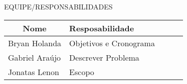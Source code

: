 		
	\begin{center}	
		EQUIPE/RESPONSABILIDADES


		\begin{table}[h]
		\centering
		\begin{tabular}{lllll}
		\hline
		\multicolumn{1}{c}{Nome} & Resposabilidade &  &  &  \\ \hline
		Bryan Holanda            &  Objetivos e Cronograma   &  &  &  \\ \hline
		Gabriel Araújo           & Descrever Problema    &  &  &  \\ \hline
		Jonatas Lenon           &  Escopo          &  &  &  \\ \hline
		\end{tabular}
		\end{table}
	\end{center}

